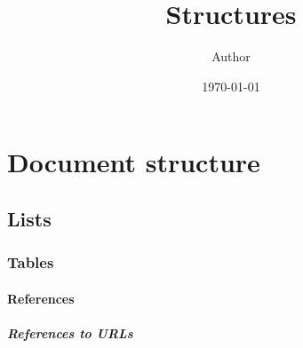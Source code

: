 \documentclass[12pt,oneside]{report}
\title{Structures}
\author{Author}
\date{\today}
\begin{document}
\maketitle
\tableofcontents
\chapter{Document structure}
\blindtext
\section{Lists}
\subsection{Tables}
\blindtext
\subsubsection{References}
\blindtext 
\paragraph{References to URLs}
\blindtext
\end{document}
